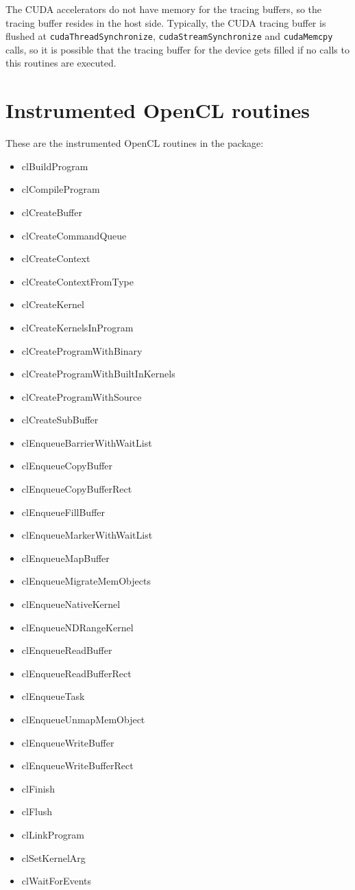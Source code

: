 The CUDA accelerators do not have memory for the tracing buffers, so the tracing buffer resides in the host side.
Typically, the CUDA tracing buffer is flushed at {\tt cudaThreadSynchronize}, {\tt cudaStreamSynchronize} and {\tt cudaMemcpy} calls, so it is possible that the tracing buffer for the device gets filled if no calls to this routines are executed.

\section{Instrumented OpenCL routines}\label{sec:OPENCLinstrumentedroutines}

These are the instrumented OpenCL routines in the \TRACE package:

\begin{itemize}
\item clBuildProgram
\item clCompileProgram
\item clCreateBuffer
\item clCreateCommandQueue
\item clCreateContext
\item clCreateContextFromType
\item clCreateKernel
\item clCreateKernelsInProgram
\item clCreateProgramWithBinary
\item clCreateProgramWithBuiltInKernels
\item clCreateProgramWithSource
\item clCreateSubBuffer
\item clEnqueueBarrierWithWaitList
\item clEnqueueCopyBuffer
\item clEnqueueCopyBufferRect
\item clEnqueueFillBuffer
\item clEnqueueMarkerWithWaitList
\item clEnqueueMapBuffer
\item clEnqueueMigrateMemObjects
\item clEnqueueNativeKernel
\item clEnqueueNDRangeKernel
\item clEnqueueReadBuffer
\item clEnqueueReadBufferRect
\item clEnqueueTask
\item clEnqueueUnmapMemObject
\item clEnqueueWriteBuffer
\item clEnqueueWriteBufferRect
\item clFinish
\item clFlush
\item clLinkProgram
\item clSetKernelArg
\item clWaitForEvents
\end{itemize}


